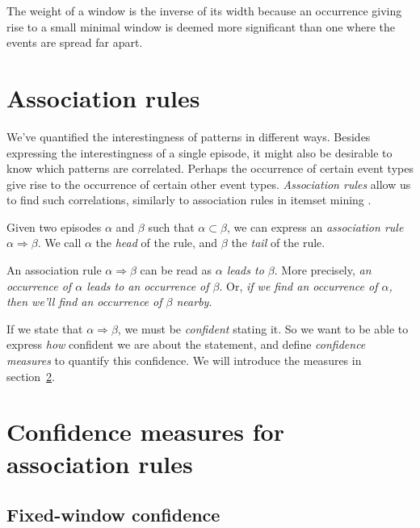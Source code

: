 The weight of a window is the inverse of its width because an occurrence giving rise to a small minimal window is deemed more significant than one where the events are spread far apart.



\section{Association rules}

We've quantified the interestingness of patterns in different ways. Besides expressing the interestingness of a single episode, it might also be desirable to know which patterns are correlated. Perhaps the occurrence of certain event types give rise to the occurrence of certain other event types. \emph{Association rules} allow us to find such correlations, similarly to association rules in itemset mining \citep{piatetsky1991discovery}.


\begin{definition}
Given two episodes $ \alpha $ and $ \beta $ such that $ \alpha \subset \beta $, we can express an \emph{association rule} $ \alpha \Rightarrow \beta $. We call $ \alpha $ the \emph{head} of the rule, and $ \beta $ the \emph{tail} of the rule.
\end{definition}

An association rule $ \alpha \Rightarrow \beta $ can be read as \emph{$ \alpha $ leads to $ \beta $}. More precisely, \emph{an occurrence of $ \alpha $ leads to an occurrence of $ \beta $}. Or, \emph{if we find an occurrence of $ \alpha $, then we'll find an occurrence of $ \beta $ nearby}.

If we state that $ \alpha \Rightarrow \beta $, we must be \emph{confident} stating it. So we want to be able to express \emph{how} confident we are about the statement, and define \emph{confidence measures} to quantify this confidence. We will introduce the measures in section~\ref{sec:interestingness-measures-association-rules}.

\section{Confidence measures for association rules}
\label{sec:interestingness-measures-association-rules}

\subsection{Fixed-window confidence}

